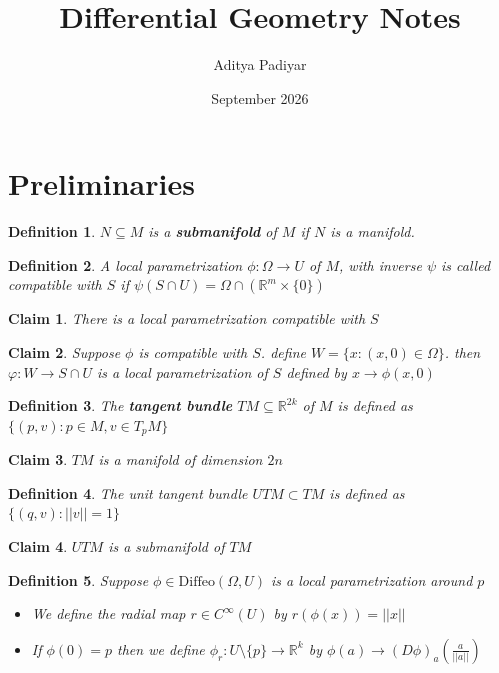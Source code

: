 \documentclass{article}
\title{Differential Geometry Notes}
\author{Aditya Padiyar}
\date{September 2026}
\newtheorem{definition}{Definition}
\newtheorem{claim}{Claim}
\begin{document}
\maketitle

\section{Preliminaries}

\begin{definition}
  $N \subseteq M$ is a \textbf{submanifold} of $M$ if $N$ is a manifold.
\end{definition}

\begin{definition}
  A local parametrization $\phi:\Omega \to U$ of $M$, with inverse $\psi$ is called compatible with $S$ if $\psi(S \cap U)=\Omega \cap (\mathbb{R}^m \times \{0\})$
\end{definition}

\begin{claim}
  There is a local parametrization compatible with $S$
\end{claim}

\begin{claim}
  Suppose $\phi$ is compatible with $S$. define $W=\{x:(x,0) \in \Omega\}$. then $\varphi:W \to S \cap U$ is a local parametrization of $S$ defined by $x \to \phi(x,0)$
\end{claim}

\begin{definition}
    The \textbf{tangent bundle} $TM \subseteq \mathbb{R}^{2k}$ of $M$ is defined as $\{(p,v): p \in M,v \in T_pM\}$
\end{definition}

\begin{claim}
    $TM$ is a manifold of dimension $2n$
\end{claim}

\begin{definition}
  The unit tangent bundle $UTM \subset TM$ is defined as $\{(q,v):||v||=1\}$
\end{definition}

\begin{claim}
  $UTM$ is a submanifold of $TM$
\end{claim}

\begin{definition}
  Suppose $\phi \in \text{Diffeo}(\Omega,U)$ is a local parametrization around $p$
  \begin{itemize}
    \item We define the radial map $r \in C^\infty(U)$ by $r(\phi(x))=||x||$
    \item If $\phi(0)=p$ then we define $\phi_r: U \setminus \{p\} \to \mathbb{R}^k$ by $\phi(a) \to (D\phi)_a \left (\frac{a}{||a||} \right )$ 
  \end{itemize}
\end{definition}
\end{document}
